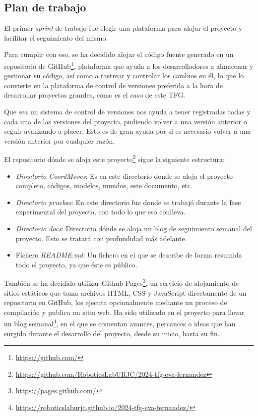 \subsection{Plan de trabajo}

El primer \textit{sprint} de trabajo fue elegir una plataforma para alojar el proyecto y facilitar el seguimiento del mismo.

Para cumplir con eso, se ha decidido alojar el código fuente generado en un repositorio de GitHub\footnote{\url{https://github.com/}}, plataforma que ayuda a los desarrolladores a almacenar y gestionar su código, así como a rastrear y controlar los cambios en él, lo que lo convierte en la plataforma de control de versiones preferida a la hora de desarrollar proyectos grandes, como es el caso de este TFG.

Que sea un sistema de control de versiones nos ayuda a tener registradas todas y cada una de las versiones del proyecto, pudiendo volver a una versión anterior o seguir avanzando a placer. Esto es de gran ayuda por si es necesario volver a una versión anterior por cualquier razón.

El repositorio dónde se aloja este proyecto\footnote{\url{https://github.com/RoboticsLabURJC/2024-tfg-eva-fernandez}} sigue la siguiente estructura:

\begin{itemize}
    \item \textit{Directorio CoordMoves}: Es en este directorio donde se aloja el proyecto completo, códigos, modelos, mundos, este documento, etc.
    \item \textit{Directorio pruebas}: En este directorio fue donde se trabajó durante la fase experimental del proyecto, con todo lo que eso conlleva. 
    \item \textit{Directorio docs}: Directorio dónde se aloja un blog de seguimiento semanal del proyecto. Esto se tratará con profundidad más adelante.
    \item Fichero \textit{README.md}: Un fichero en el que se describe de forma resumida todo el proyecto, ya que éste es público.
\end{itemize}

También se ha decidido utilizar Github Pages\footnote{\url{https://pages.github.com/}}, un servicio de alojamiento de sitios estáticos que toma archivos HTML, CSS y JavaScript directamente de un repositorio en GitHub, los ejecuta opcionalmente mediante un proceso de compilación y publica un sitio web. Ha sido utilizado en el proyecto para llevar un blog semanal\footnote{\url{https://roboticslaburjc.github.io/2024-tfg-eva-fernandez/}}, en el que se comentan avances, percances o ideas que han surgido durante el desarrollo del proyecto, desde su inicio, hasta su fin.

